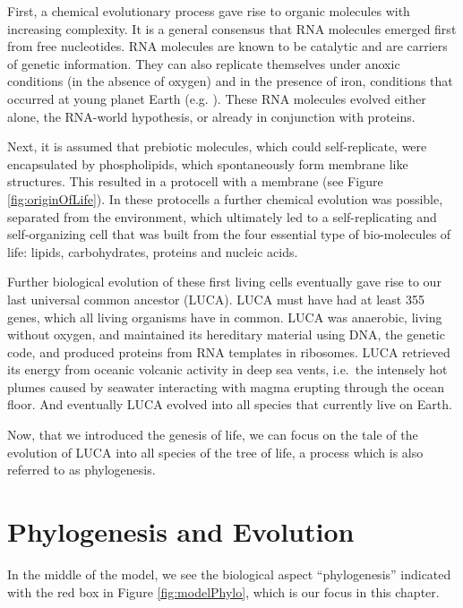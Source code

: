 \documentclass[
  11pt,
]{book}
\begin{document}
First, a chemical evolutionary process gave rise to organic molecules with increasing complexity. It is a general consensus that RNA molecules emerged first from free nucleotides. RNA molecules are known to be catalytic and are carriers of genetic information. They can also replicate themselves under anoxic conditions (in the absence of oxygen) and in the presence of iron, conditions that occurred at young planet Earth (e.g. \citet{Williams2013}). These RNA molecules evolved either alone, the RNA-world hypothesis, or already in conjunction with proteins.

Next, it is assumed that prebiotic molecules, which could self-replicate, were encapsulated by phospholipids, which spontaneously form membrane like structures. This resulted in a protocell with a membrane (see Figure \ref{fig:originOfLife}).
In these protocells a further chemical evolution was possible, separated from the environment, which ultimately led to a self-replicating and self-organizing cell that was built from the four essential type of bio-molecules of life: lipids, carbohydrates, proteins and nucleic acids.

Further biological evolution of these first living cells eventually gave rise to our last universal common ancestor (LUCA).
LUCA must have had at least 355 genes, which all living organisms have in common.
LUCA was anaerobic, living without oxygen, and maintained its hereditary material using DNA, the genetic code, and produced proteins from RNA templates in ribosomes. LUCA retrieved its energy from oceanic volcanic activity in deep sea vents, i.e.~the intensely hot plumes caused by seawater interacting with magma erupting through the ocean floor. And eventually LUCA evolved into all species that currently live on Earth.

Now, that we introduced the genesis of life, we can focus on the tale of the evolution of LUCA into all species of the tree of life, a process which is also referred to as phylogenesis.

\hypertarget{phylogenesis-and-evolution}{%
\chapter{Phylogenesis and Evolution}\label{phylogenesis-and-evolution}}

In the middle of the model, we see the biological aspect ``phylogenesis'' indicated with the red box in Figure \ref{fig:modelPhylo}, which is our focus in this chapter.
\end{document}
